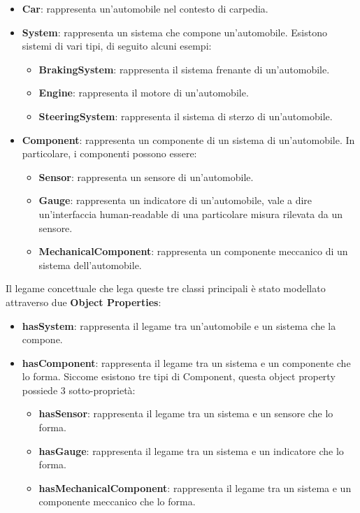 \begin{itemize}
    \item \textbf{Car}: rappresenta un'automobile nel contesto di carpedia.
    \item \textbf{System}: rappresenta un sistema che compone un'automobile. Esistono sistemi di vari tipi, di seguito alcuni esempi:
          \begin{itemize}
              \item \textbf{BrakingSystem}: rappresenta il sistema frenante di un'automobile.
              \item \textbf{Engine}: rappresenta il motore di un'automobile.
              \item \textbf{SteeringSystem}: rappresenta il sistema di sterzo di un'automobile.
          \end{itemize}
    \item \textbf{Component}: rappresenta un componente di un sistema di un'automobile. In particolare, i componenti possono essere:
          \begin{itemize}
              \item \textbf{Sensor}: rappresenta un sensore di un'automobile.
              \item \textbf{Gauge}: rappresenta un indicatore di un'automobile, vale a dire un'interfaccia human-readable di una particolare misura rilevata da un sensore.
              \item \textbf{MechanicalComponent}: rappresenta un componente meccanico di un sistema dell'automobile.
          \end{itemize}
\end{itemize}

Il legame concettuale che lega queste tre classi principali è stato modellato attraverso due \textbf{Object Properties}:

\begin{itemize}
    \item \textbf{hasSystem}: rappresenta il legame tra un'automobile e un sistema che la compone.
    \item \textbf{hasComponent}: rappresenta il legame tra un sistema e un componente che lo forma. Siccome esistono tre tipi di Component, questa object property possiede 3 sotto-proprietà:
          \begin{itemize}
              \item \textbf{hasSensor}: rappresenta il legame tra un sistema e un sensore che lo forma.
              \item \textbf{hasGauge}: rappresenta il legame tra un sistema e un indicatore che lo forma.
              \item \textbf{hasMechanicalComponent}: rappresenta il legame tra un sistema e un componente meccanico che lo forma.
          \end{itemize}
\end{itemize}

